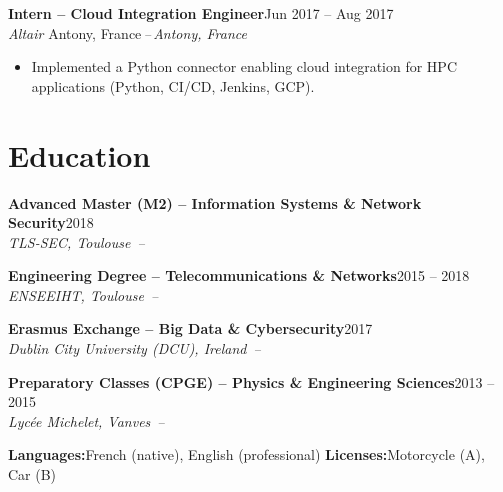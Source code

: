 \documentclass[10pt,a4paper]{article}
\newcommand{\cventry}[4]{%
  \textbf{#1}\hfill\textcolor{muted}{\small #4}\\[0.5pt]%
  \textcolor{accent}{\itshape #2}%
  \ifx\relax#3\relax\else\textcolor{muted}{\itshape\,--\,#3}\fi\par\vspace{1.5pt}%
}
\begin{document}
\cventry{Intern -- Cloud Integration Engineer}{Altair}{Antony, France}{Jun 2017 -- Aug 2017}
\begin{itemize}
  \item Implemented a Python connector enabling cloud integration for HPC applications (Python, CI/CD, Jenkins, GCP).
\end{itemize}

\section{Education}

\cventry{Advanced Master (M2) -- Information Systems \& Network Security}{TLS-SEC, Toulouse}{}{2018}
\par\vspace{3pt}

\cventry{Engineering Degree -- Telecommunications \& Networks}{ENSEEIHT, Toulouse}{}{2015 -- 2018}
\par\vspace{3pt}

\cventry{Erasmus Exchange -- Big Data \& Cybersecurity}{Dublin City University (DCU), Ireland}{}{2017}
\par\vspace{3pt}

\cventry{Preparatory Classes (CPGE) -- Physics \& Engineering Sciences}{Lycée Michelet, Vanves}{}{2013 -- 2015}

\vspace{6pt}
{\color{accent}\titlerule[0.8pt]}\vspace{4pt}
\textbf{\color{accent}Languages:}\enspace French (native), English (professional)%
\hfill
\textbf{\color{accent}Licenses:}\enspace Motorcycle (A), Car (B)
\end{document}
